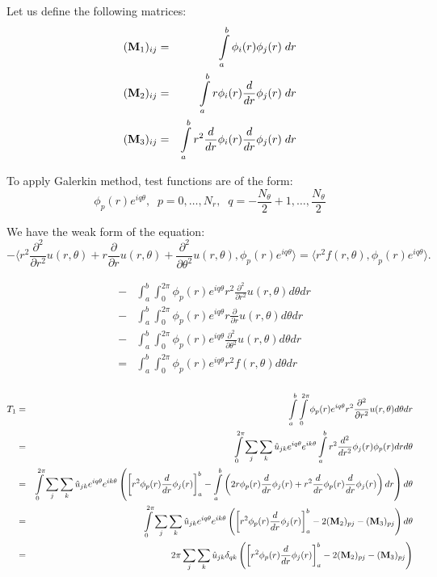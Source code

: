 Let us define the following matrices:
\begin{eqnarray}
({\bf M}_1)_{ij} & = & \int_a^b \phi_i(r) \phi_j(r) \;dr  \\
({\bf M}_2)_{ij} & = & \int_a^b r \phi_i(r) \frac{d}{dr} \phi_j(r) \;dr  \\
({\bf M}_3)_{ij} & = & \int_a^b r^2  \frac{d}{dr} \phi_i(r)  \frac{d}{dr} \phi_j(r) \;dr
\end{eqnarray}

To apply Galerkin method, test functions are of the form:
\begin{equation}
\phi_p(r) e^{iq\theta}, \;\; p=0,\ldots,N_r, \;\; q = -\frac{N_\theta}{2}+1,\ldots,\frac{N_\theta}{2}
\end{equation}

We have the weak form of the equation:
\begin{equation}
-\langle  r^2 \frac{\partial^2}{\partial r^2} u(r,\theta) + r \frac{\partial}{\partial r} u(r,\theta) + \frac{\partial^2}{\partial \theta^2} u(r,\theta), \phi_p(r) e^{iq\theta} \rangle = \langle r^2 f(r,\theta), \phi_p(r) e^{iq\theta} \rangle.
\end{equation}

\begin{eqnarray}
&-& \int_a^b \int_0^{2\pi} \phi_p(r) e^{iq\theta} r^2 \frac{\partial^2}{\partial r^2} u(r,\theta) d\theta dr \\
&-& \int_a^b \int_0^{2\pi} \phi_p(r) e^{iq\theta} r \frac{\partial}{\partial r} u(r,\theta) d\theta dr \\
&-& \int_a^b \int_0^{2\pi} \phi_p(r) e^{iq\theta} \frac{\partial^2}{\partial \theta^2} u(r,\theta) d\theta dr  \\
&=& \int_a^b \int_0^{2\pi} \phi_p(r) e^{iq\theta} r^2 f(r,\theta) d\theta dr \\
\end{eqnarray}


\begin{eqnarray}
T_1 &=& \int_a^b \int_0^{2\pi} \phi_p(r) e^{iq\theta} r^2 \frac{\partial^2}{\partial r^2} u(r,\theta) d\theta dr \\
    &=& \int_0^{2\pi} \sum_j \sum_k \hat{u}_{jk} e^{iq\theta} e^{ik\theta} \int_a^b r^2 \frac{d^2}{dr^2} \phi_j(r) \phi_p(r) dr d\theta\\
    &=& \int_0^{2\pi} \sum_j \sum_k \hat{u}_{jk} e^{iq\theta} e^{ik\theta} \left( \left[r^2 \phi_p(r) \frac{d}{dr}\phi_j(r)\right]_a^b -
        \int_a^b \left(2 r \phi_p(r) \frac{d}{dr}\phi_j(r) + r^2 \frac{d}{dr}\phi_p(r) \frac{d}{dr}\phi_j(r)\right) dr \right) d\theta \\
    &=& \int_0^{2\pi} \sum_j \sum_k \hat{u}_{jk} e^{iq\theta} e^{ik\theta} \left( \left[r^2 \phi_p(r) \frac{d}{dr}\phi_j(r)\right]_a^b - 2 ({\bf M}_2)_{pj} - ({\bf M}_3)_{pj} \right) d\theta \\
    &=& 2\pi \sum_j \sum_k \hat{u}_{jk} \delta_{qk} \left( \left[r^2 \phi_p(r) \frac{d}{dr}\phi_j(r)\right]_a^b - 2 ({\bf M}_2)_{pj} - ({\bf M}_3)_{pj} \right)
\end{eqnarray}

